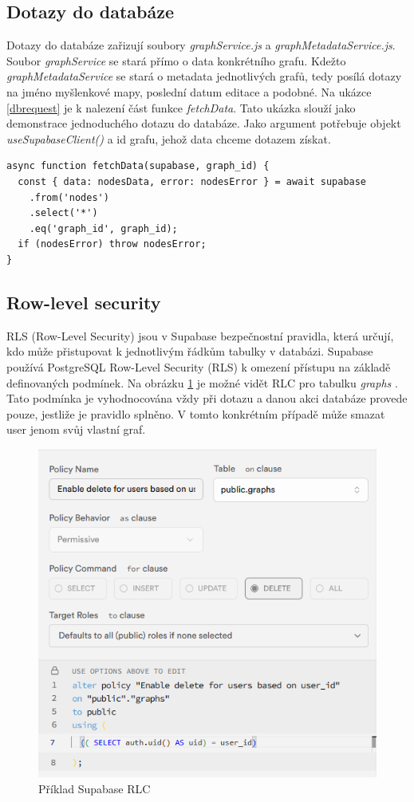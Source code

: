 \subsection{Dotazy do databáze}
Dotazy do databáze zařizují soubory \textit{graphService.js} a \textit{graphMetadataService.js}. Soubor \textit{graphService} se stará přímo o data konkrétního grafu. Kdežto \textit{graphMetadataService} se stará o metadata jednotlivých grafů, tedy posílá dotazy na jméno myšlenkové mapy, poslední datum editace a podobné.
\newline
Na ukázce \ref{dbrequest} je k nalezení část funkce \textit{fetchData}. Tato ukázka slouží jako demonstrace jednoduchého dotazu do databáze. Jako argument potřebuje objekt \textit{useSupabaseClient()} a id grafu, jehož data chceme dotazem získat.\cite{NetNinja1}

\begin{lstlisting}[style=JavaScript, firstnumber = 206, caption={utils/graphService.js, dotaz do databáze}, label={dbrequest}]
async function fetchData(supabase, graph_id) {
  const { data: nodesData, error: nodesError } = await supabase
    .from('nodes')
    .select('*')
    .eq('graph_id', graph_id);
  if (nodesError) throw nodesError;
}
\end{lstlisting}
\subsection{Row-level security}
RLS (Row-Level Security) jsou v Supabase bezpečnostní pravidla, která určují, kdo může přistupovat k jednotlivým řádkům tabulky v databázi. Supabase používá PostgreSQL Row-Level Security (RLS) k omezení přístupu na základě definovaných podmínek.\cite{RLC}
\newline
Na obrázku \ref{fig:RLC} je možné vidět RLC pro tabulku \textit{graphs} . Tato podmínka je vyhodnocována vždy při dotazu a danou akci databáze provede pouze, jestliže je pravidlo splněno. V tomto konkrétním případě může smazat user jenom svůj vlastní graf.
\begin{figure}[h]
    \centering
    \includegraphics[width=0.6\linewidth]{Images/RLC.png}
    \caption{Příklad Supabase RLC}
    \label{fig:RLC}
\end{figure}
